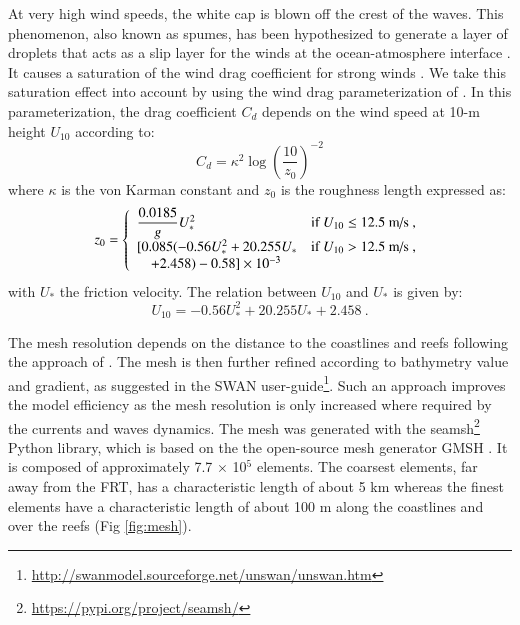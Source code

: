 \documentclass[preprint,12pt,authoryear]{elsarticle}
\begin{document}
At very high wind speeds, the white cap is blown off the crest of the waves. This phenomenon, also known as spumes, has been hypothesized to generate a layer of droplets that acts as a slip layer for the winds at the ocean-atmosphere interface \citep{holthuijsen2012wind}. It causes a saturation of the wind drag coefficient for strong winds \citep{powell2003reduced,donelan2004limiting,curcic2020revised}. We take this saturation effect into account by using the wind  drag parameterization of \cite{moon2007physics}. In this parameterization, the drag coefficient $C_d$ depends on the wind speed at 10-m height $U_{10}$ according to:
\begin{equation}
    C_d = \kappa^2 \log\left(\dfrac{10}{z_0}\right)^{-2}\label{eq:drag}
\end{equation}
where $\kappa$ is the von Karman constant and $z_0$ is the roughness length expressed as: 
\begin{equation}
    z_0 =\left\{\begin{array}[]{ll}
        \dfrac{0.0185}{g}U_{\ast}^2 & \text{if }U_{10} \leq 12.5\text{ m/s}~, \\
        \lbrack 0.085(-0.56U_{\ast}^2+20.255U_{\ast} & \text{if }U_{10} > 12.5\text{ m/s}~, \\
        \quad +2.458) - 0.58\rbrack\times 10^{-3} 
    \end{array}\right.
\end{equation}
with $U_\ast$ the friction velocity. The relation between $U_{10}$ and $U_{\ast}$ is given by:
\begin{equation}
    U_{10}=-0.56U_{\ast}^2+20.255U_{\ast}+2.458~.
\end{equation}

The mesh resolution depends on the distance to the coastlines and reefs following the approach of \cite{dobbelaere2020coupled}. The mesh is then further refined according to bathymetry value and gradient, as suggested in the SWAN user-guide\footnote{\url{http://swanmodel.sourceforge.net/unswan/unswan.htm}}. Such an approach improves the model efficiency as the mesh resolution is only increased where required by the currents and waves dynamics. The mesh was generated with the seamsh\footnote{\url{https://pypi.org/project/seamsh/}} Python library, which is based on the the open-source mesh generator GMSH \citep{geuzaine2009gmsh}. It is composed of approximately 7.7 $\times$ 10$^5$ elements. The coarsest elements, far away from the FRT, has a characteristic length of about 5 km whereas the finest elements have a characteristic length of about 100 m along the coastlines and over the reefs (Fig \ref{fig:mesh}).
\end{document}
